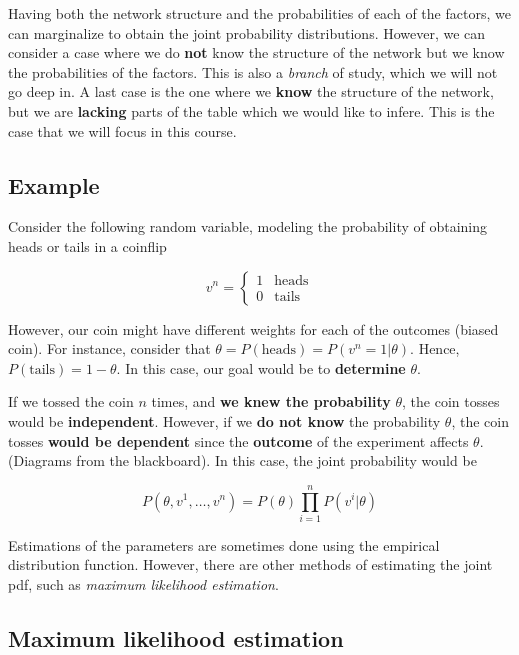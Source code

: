 \documentclass[
]{article}
\begin{document}
Having both the network structure and the probabilities of each of the
factors, we can marginalize to obtain the joint probability
distributions. However, we can consider a case where we do \textbf{not}
know the structure of the network but we know the probabilities of the
factors. This is also a \emph{branch} of study, which we will not go
deep in. A last case is the one where we \textbf{know} the structure of
the network, but we are \textbf{lacking} parts of the table which we
would like to infere. This is the case that we will focus in this
course.

\hypertarget{example}{%
\subsection{Example}\label{example}}

Consider the following random variable, modeling the probability of
obtaining heads or tails in a coinflip

\[
v^n =\begin{cases}
1 & \text{heads}\\
0 & \text{tails}
\end{cases}
\]

However, our coin might have different weights for each of the outcomes
(biased coin). For instance, consider that
\(\theta = P(\text{heads}) = P(v^n = 1| \theta)\). Hence,
\(P(\text{tails}) = 1-\theta\). In this case, our goal would be to
\textbf{determine} \(\theta\).

If we tossed the coin \(n\) times, and \textbf{we knew the probability}
\(\theta\), the coin tosses would be \textbf{independent}. However, if
we \textbf{do not know} the probability \(\theta\), the coin tosses
\textbf{would be dependent} since the \textbf{outcome} of the experiment
affects \(\theta\). (Diagrams from the blackboard). In this case, the
joint probability would be

\[
P(\theta,v^1,\dots,v^n) = P(\theta)\prod_{i=1}^n P(v^i|\theta)
\]

Estimations of the parameters are sometimes done using the empirical
distribution function. However, there are other methods of estimating
the joint pdf, such as \emph{maximum likelihood estimation}.

\hypertarget{maximum-likelihood-estimation}{%
\subsection{Maximum likelihood
estimation}\label{maximum-likelihood-estimation}}
\end{document}
